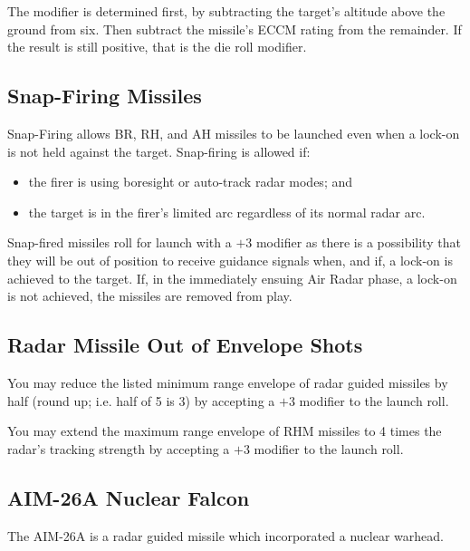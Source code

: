 The modifier is determined first, by subtracting the target's altitude above the ground from six. Then subtract the missile's ECCM rating from the remainder. If the result is still positive, that is the die roll modifier.


\advancedrules

\subsection{Snap-Firing Missiles}

Snap-Firing allows BR, RH, and AH missiles to be launched even when a lock-on is not held against the target. Snap-firing is allowed if:

\begin{itemize}
    \item the firer is using boresight or auto-track radar modes; and
    \item the target is in the firer's limited arc regardless of its normal radar arc.
\end{itemize}

Snap-fired missiles roll for launch with a $+3$ modifier as there is a possibility that they will be out of position to receive guidance signals when, and if, a lock-on is achieved to the target. If, in the immediately ensuing Air Radar phase, a lock-on is not achieved, the missiles are removed from play.

\subsection{Radar Missile Out of Envelope Shots}

You may reduce the listed minimum range envelope of radar guided missiles by half (round up; i.e. half of 5 is 3) by accepting a $+3$ modifier to the launch roll.

You may extend the maximum range envelope of RHM missiles to 4 times the radar's tracking strength by accepting a $+3$ modifier to the launch roll.

\subsection{AIM-26A Nuclear Falcon}

The AIM-26A is a radar guided missile which incorporated a nuclear warhead.

